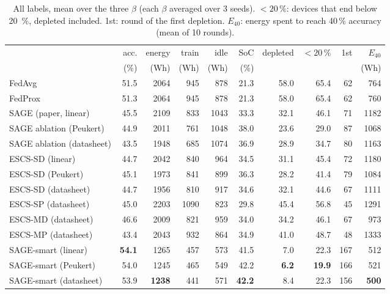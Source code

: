 \documentclass[11pt,a4paper]{article}
\begin{document}
\begin{table}[H]
\centering
\small
\caption{All labels, mean over the three $\beta$ (each $\beta$ averaged over 3
seeds). $<20\,\%$: devices that end below \SI{20}{\percent}, depleted included.
1st: round of the first depletion. $E_{40}$: energy spent to reach 40\,\%
accuracy (mean of 10 rounds).}
\label{tab:all}
\begin{tabular}{lrrrrrrrrr}
\toprule
& acc. & energy & train & idle & SoC & depleted & $<20\,\%$ & 1st & $E_{40}$ \\
& (\%) & (Wh) & (Wh) & (Wh) & (\%) & & & & (Wh) \\
\midrule
FedAvg                    & 51.5 & 2064 & 945 &  878 & 21.3 & 58.0 & 65.4 &  62 &  764 \\
FedProx                   & 51.3 & 2064 & 945 &  878 & 21.3 & 58.0 & 65.4 &  62 &  760 \\
\midrule
SAGE (paper, linear)      & 45.5 & 2109 & 833 & 1043 & 33.3 & 32.1 & 46.1 &  71 & 1182 \\
SAGE ablation (Peukert)   & 44.9 & 2011 & 761 & 1048 & 38.0 & 23.6 & 29.0 &  87 & 1068 \\
SAGE ablation (datasheet) & 43.5 & 1948 & 685 & 1074 & 36.9 & 28.9 & 34.7 &  80 & 1163 \\
\midrule
ESCS-SD (linear)          & 44.7 & 2042 & 840 &  964 & 34.5 & 31.1 & 45.4 &  72 & 1180 \\
ESCS-SD (Peukert)         & 45.1 & 1973 & 841 &  899 & 36.3 & 28.2 & 41.4 &  79 & 1084 \\
ESCS-SD (datasheet)       & 44.7 & 1956 & 810 &  917 & 34.6 & 32.1 & 44.6 &  67 & 1111 \\
ESCS-SP (datasheet)       & 45.0 & 2203 & 1090 & 823 & 29.8 & 45.4 & 56.8 &  45 & 1291 \\
ESCS-MD (datasheet)       & 46.6 & 2009 & 821 &  959 & 34.0 & 34.2 & 46.1 &  67 &  973 \\
ESCS-MP (datasheet)       & 43.4 & 2043 & 932 &  864 & 34.9 & 41.0 & 48.7 &  48 & 1333 \\
\midrule
SAGE-smart (linear)       & \textbf{54.1} & 1265 & 457 & 573 & 41.5 & 7.0 & 22.3 & 167 & 512 \\
SAGE-smart (Peukert)      & 54.0 & 1245 & 465 & 549 & 42.2 & \textbf{6.2} & \textbf{19.9} & 166 & 521 \\
SAGE-smart (datasheet)    & 53.9 & \textbf{1238} & 441 & 571 & \textbf{42.2} & 8.4 & 22.3 & 156 & \textbf{500} \\
\bottomrule
\end{tabular}
\end{table}
\end{document}
